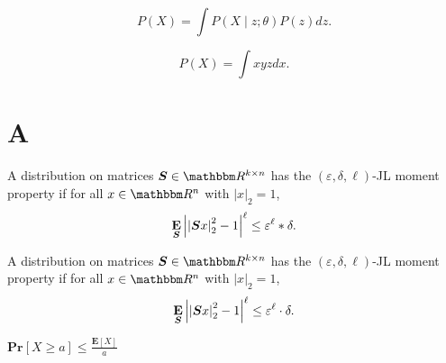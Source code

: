 \documentclass[11pt]{article}
\begin{document}
$$P(X) = \int P(X \mid z; \theta) P(z) dz.$$

$$P(X) = \int xyz dx.$$

\section{A}




\begin{definition}[Using *]
    A distribution on matrices $\bS \in \R^{k \times n}$ has the $\left( \varepsilon, \delta, \ell \right)$-JL
    moment property if for all $x \in \R^n$ with $\lvert x \rvert_2 = 1$,
    $$ \operatorname*{\mathbf{E}}_{\boldsymbol{S}} \left\lvert \left\lvert \boldsymbol{S} x \right\rvert_2^2 - 1 \right\rvert^\ell \leq \varepsilon^\ell * \delta. $$
\end{definition}

\begin{definition}
    A distribution on matrices $\bS \in \R^{k \times n}$ has the $\left( \varepsilon, \delta, \ell \right)$-JL
    moment property if for all $x \in \R^n$ with $\lvert x \rvert_2 = 1$,
    $$ \operatorname*{\mathbf{E}}_{\boldsymbol{S}} \left\lvert \left\lvert \boldsymbol{S} x \right\rvert_2^2 - 1 \right\rvert^\ell \leq \varepsilon^\ell \cdot \delta. $$
\end{definition}

$ \mathbf{Pr} \left[ X \geq a \right] \leq \frac{\mathbf{E}[X]}{a}$
\end{document}
